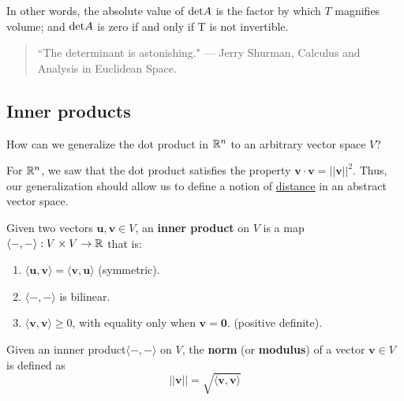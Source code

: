 In other words, the absolute value of $\textnormal{det}A$ is the factor by which $T$ magnifies volume; and $\textnormal{det}A$ is zero if and only if T is not invertible. 



    \begin{quote}
        ``The determinant is astonishing."       --- Jerry Shurman, \textnormal{Calculus and Analysis in Euclidean Space}.
    \end{quote}








\subsection{Inner products}

\begin{motivating}
How can we generalize the dot product in  $\mathbb{R}^n$ to an arbitrary vector space $V$?  
\end{motivating}

For $\mathbb{R}^n$, we saw that the dot product satisfies the property $\bm{v} \cdot \bm{v} = ||\bm{v}||^2$. Thus, our generalization should allow us to define a notion of \underline{distance} in an abstract vector space.

\begin{definition}
    
    Given two vectors $\bm{u},\bm{v} \in V$, an \textbf{inner product} on $V$ is a map $\langle - , - \rangle :  V \times V \to \mathbb{R}$ that is:
    \vspace{1em}
    
    \begin{enumerate}
        \item $\langle \bm{u}, \bm{v} \rangle = \langle \bm{v}, \bm{u} \rangle$ (symmetric).
        \item $\langle - , - \rangle$ is bilinear.
        \item $\langle \bm{v}, \bm{v} \rangle \geq 0$, with equality only when $\bm{v} = \bm{0}$. (positive definite).  
    \end{enumerate}
    
    \end{definition}

\begin{definition}
    Given an innner product$\langle - , - \rangle$ on $V$, the \textbf{norm} (or \textbf{modulus}) of a vector $\bm{v} \in V$ is defined as $$||\bm{v}|| = \sqrt{\langle \bm{v}, \bm{v}\rangle}$$
    \end{definition}
    

